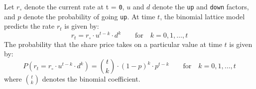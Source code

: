 \documentclass[11pt]{article}
\theoremstyle{definition}
\begin{document}
\begin{definition}\label{defn-binomial-distribution-rate}
	Let $r_{\circ}$ denote the current rate at t = \texttt{0}, $u$ and $d$ denote the \texttt{up} and \texttt{down} factors, 
	and $p$ denote the probability of going \texttt{up}.
	At time $t$, the binomial lattice model predicts the rate $r_{t}$ is given by:
	\begin{equation*}
	r_{t} = r_{\circ}\cdot{u}^{t-k}\cdot{d}^{k}\qquad\text{for}\quad{k=0,1,\dots,t}
	\end{equation*}
	The probability that the share price takes on a particular value at time $t$ is given by:
	\begin{equation*}
	P(r_{t} = r_{\circ}\cdot{u}^{t-k}\cdot{d}^{k}) = \binom{t}{k}\cdot{(1-p)}^{k}\cdot{p}^{t-k}\qquad\text{for}\quad{k=0,1,\dots,t}
	\end{equation*}
	where $\binom{t}{k}$ denotes the binomial coefficient.
\end{definition}

\clearpage


\clearpage
\printindex
\end{document}
